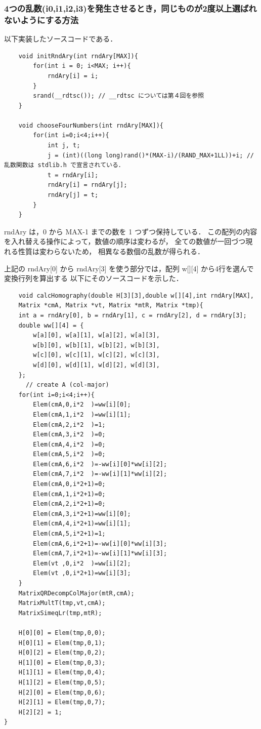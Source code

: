 \documentclass[11pt]{jarticle}
\begin{document}
\subsubsection{4つの乱数(i0,i1,i2,i3)を発生させるとき，同じものが2度以上選ばれないようにする方法}
以下実装したソースコードである．
\begin{verbatim}
    void initRndAry(int rndAry[MAX]){
        for(int i = 0; i<MAX; i++){
            rndAry[i] = i;
        }
        srand(__rdtsc()); // __rdtsc については第４回を参照
    }

    void chooseFourNumbers(int rndAry[MAX]){
        for(int i=0;i<4;i++){
            int j, t;
            j = (int)((long long)rand()*(MAX-i)/(RAND_MAX+1LL))+i; // 乱数関数は stdlib.h で宣言されている．
            t = rndAry[i]; 
            rndAry[i] = rndAry[j]; 
            rndAry[j] = t;
        }
    }
\end{verbatim}
rndAry は，0 から MAX-1 までの数を 1 つずつ保持している． この配列の内容を入れ替える操作によって，数値の順序は変わるが，
全ての数値が一回づつ現れる性質は変わらないため， 相異なる数個の乱数が得られる．

上記の rndAry[0] から rndAry[3] を使う部分では，配列 w[][4] から4行を選んで変換行列を算出する
以下にそのソースコードを示した．

\begin{verbatim}
    void calcHomography(double H[3][3],double w[][4],int rndAry[MAX], 
    Matrix *cmA, Matrix *vt, Matrix *mtR, Matrix *tmp){
    int a = rndAry[0], b = rndAry[1], c = rndAry[2], d = rndAry[3];
    double ww[][4] = {
        w[a][0], w[a][1], w[a][2], w[a][3],
        w[b][0], w[b][1], w[b][2], w[b][3],
        w[c][0], w[c][1], w[c][2], w[c][3],
        w[d][0], w[d][1], w[d][2], w[d][3],
    };
      // create A (col-major)
    for(int i=0;i<4;i++){
        Elem(cmA,0,i*2  )=ww[i][0];
        Elem(cmA,1,i*2  )=ww[i][1];
        Elem(cmA,2,i*2  )=1;
        Elem(cmA,3,i*2  )=0;
        Elem(cmA,4,i*2  )=0;
        Elem(cmA,5,i*2  )=0;
        Elem(cmA,6,i*2  )=-ww[i][0]*ww[i][2];
        Elem(cmA,7,i*2  )=-ww[i][1]*ww[i][2];
        Elem(cmA,0,i*2+1)=0;
        Elem(cmA,1,i*2+1)=0;
        Elem(cmA,2,i*2+1)=0;
        Elem(cmA,3,i*2+1)=ww[i][0];
        Elem(cmA,4,i*2+1)=ww[i][1];
        Elem(cmA,5,i*2+1)=1;
        Elem(cmA,6,i*2+1)=-ww[i][0]*ww[i][3];
        Elem(cmA,7,i*2+1)=-ww[i][1]*ww[i][3];
        Elem(vt ,0,i*2  )=ww[i][2];
        Elem(vt ,0,i*2+1)=ww[i][3];
    }
    MatrixQRDecompColMajor(mtR,cmA);
    MatrixMultT(tmp,vt,cmA);
    MatrixSimeqLr(tmp,mtR);

    H[0][0] = Elem(tmp,0,0);
    H[0][1] = Elem(tmp,0,1);
    H[0][2] = Elem(tmp,0,2);
    H[1][0] = Elem(tmp,0,3);
    H[1][1] = Elem(tmp,0,4);
    H[1][2] = Elem(tmp,0,5);
    H[2][0] = Elem(tmp,0,6);
    H[2][1] = Elem(tmp,0,7);
    H[2][2] = 1;
}
\end{verbatim}
\end{document}
